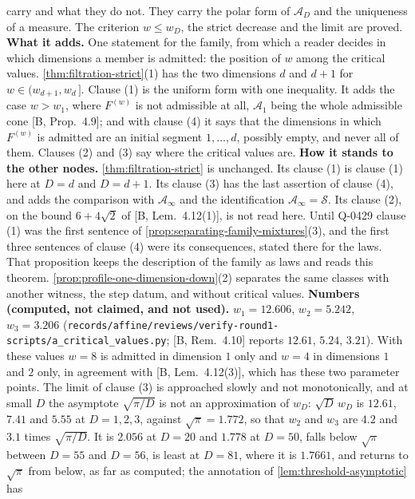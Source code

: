 \begin{theorem}
{{carry and what they do not.} They carry the polar form of
$\mathcal{A}_D$ and the uniqueness of a \Levy{} measure. The criterion $w \le w_D$, the strict
decrease and the limit are proved. \textbf{What it adds.} One statement for the family, from
which a reader decides in which dimensions a member is admitted: the position of $w$ among the
critical values. \ref{thm:filtration-strict}(1) has the two dimensions $d$ and $d + 1$ for
$w \in (w_{d+1}, w_d\,]$. Clause (1) is the uniform form with one inequality. It adds the case
$w > w_1$, where $F^{(w)}$ is not admissible at all, $\mathcal{A}_1$ being the whole admissible
cone [B, Prop.~4.9]; and with clause (4) it says that the dimensions in which $F^{(w)}$ is admitted are an initial
segment $1, \dots, d$, possibly empty, and never all of them. Clauses (2) and (3) say where the
critical values are. \textbf{How it stands to the other nodes.} \ref{thm:filtration-strict} is
unchanged. Its clause (1) is clause (1) here at $D = d$ and $D = d + 1$. Its clause (3) has the
last assertion of clause (4), and adds the comparison with $\mathcal{A}_\infty$ and the
identification $\mathcal{A}_\infty = \mathcal{S}$. Its clause (2), on the bound $6 + 4\sqrt2$ of
[B, Lem.~4.12(1)], is not read here. Until Q-0429 clause (1) was the first sentence of
\ref{prop:separating-family-mixtures}(3), and the first three sentences of clause (4) were its
consequences, stated there for the laws. That proposition keeps the description of the family as
laws and reads this theorem. \ref{prop:profile-one-dimension-down}(2) separates the same classes
with another witness, the step datum, and without critical values. \textbf{Numbers (computed,
not claimed, and not used).} $w_1 = 12.606$, $w_2 = 5.242$, $w_3 = 3.206$
(\texttt{records/affine/reviews/verify-round1-scripts/a\_critical\_values.py}; [B, Rem.~4.10]
reports $12.61$, $5.24$, $3.21$). With these values $w = 8$ is admitted in dimension $1$ only
and $w = 4$ in dimensions $1$ and $2$ only, in agreement with [B, Lem.~4.12(3)], which has these
two parameter points. The limit of clause
(3) is approached slowly and not monotonically, and at small $D$ the asymptote $\sqrt{\pi/D}$ is
not an approximation of $w_D$: $\sqrt D\,w_D$ is $12.61$, $7.41$ and $5.55$ at $D = 1, 2, 3$,
against $\sqrt\pi = 1.772$, so that $w_2$ and $w_3$ are $4.2$ and $3.1$ times
$\sqrt{\pi/D}$. It is $2.056$ at $D = 20$ and $1.778$ at $D = 50$, falls below $\sqrt\pi$
between $D = 55$ and $D = 56$, is least at $D = 81$, where it is $1.7661$, and returns to
$\sqrt\pi$ from below, as far as computed; the annotation of \ref{lem:threshold-asymptotic} has
}
\end{theorem}
